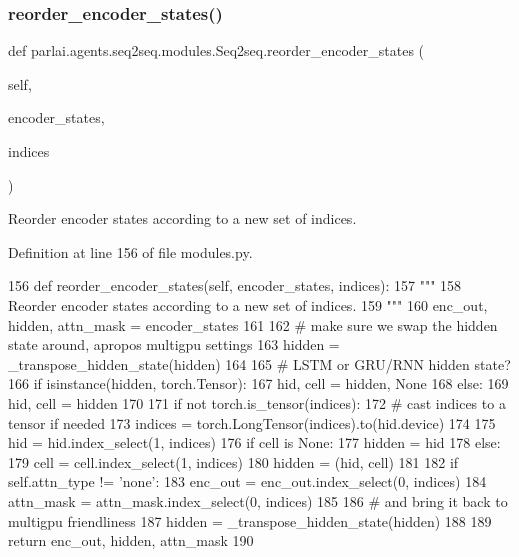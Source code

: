 \subsubsection{\texorpdfstring{reorder\+\_\+encoder\+\_\+states()}{reorder\_encoder\_states()}}
{\footnotesize\ttfamily def parlai.\+agents.\+seq2seq.\+modules.\+Seq2seq.\+reorder\+\_\+encoder\+\_\+states (\begin{DoxyParamCaption}\item[{}]{self,  }\item[{}]{encoder\+\_\+states,  }\item[{}]{indices }\end{DoxyParamCaption})}

\begin{DoxyVerb}Reorder encoder states according to a new set of indices.
\end{DoxyVerb}
 

Definition at line 156 of file modules.\+py.


\begin{DoxyCode}
156     \textcolor{keyword}{def }reorder\_encoder\_states(self, encoder\_states, indices):
157         \textcolor{stringliteral}{"""}
158 \textcolor{stringliteral}{        Reorder encoder states according to a new set of indices.}
159 \textcolor{stringliteral}{        """}
160         enc\_out, hidden, attn\_mask = encoder\_states
161 
162         \textcolor{comment}{# make sure we swap the hidden state around, apropos multigpu settings}
163         hidden = \_transpose\_hidden\_state(hidden)
164 
165         \textcolor{comment}{# LSTM or GRU/RNN hidden state?}
166         \textcolor{keywordflow}{if} isinstance(hidden, torch.Tensor):
167             hid, cell = hidden, \textcolor{keywordtype}{None}
168         \textcolor{keywordflow}{else}:
169             hid, cell = hidden
170 
171         \textcolor{keywordflow}{if} \textcolor{keywordflow}{not} torch.is\_tensor(indices):
172             \textcolor{comment}{# cast indices to a tensor if needed}
173             indices = torch.LongTensor(indices).to(hid.device)
174 
175         hid = hid.index\_select(1, indices)
176         \textcolor{keywordflow}{if} cell \textcolor{keywordflow}{is} \textcolor{keywordtype}{None}:
177             hidden = hid
178         \textcolor{keywordflow}{else}:
179             cell = cell.index\_select(1, indices)
180             hidden = (hid, cell)
181 
182         \textcolor{keywordflow}{if} self.attn\_type != \textcolor{stringliteral}{'none'}:
183             enc\_out = enc\_out.index\_select(0, indices)
184             attn\_mask = attn\_mask.index\_select(0, indices)
185 
186         \textcolor{comment}{# and bring it back to multigpu friendliness}
187         hidden = \_transpose\_hidden\_state(hidden)
188 
189         \textcolor{keywordflow}{return} enc\_out, hidden, attn\_mask
190 
\end{DoxyCode}


